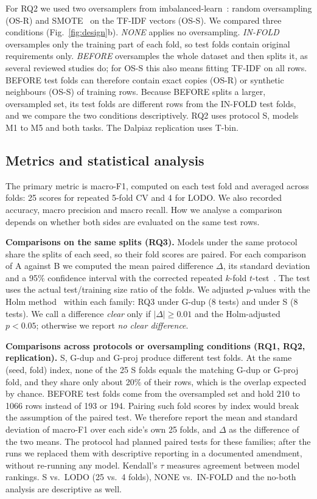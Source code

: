For RQ2 we used two oversamplers from imbalanced-learn~\cite{lemaitre2017}: random oversampling (OS-R) and SMOTE~\cite{chawla2002} on the TF-IDF vectors (OS-S). We compared three conditions (Fig.~\ref{fig:design}b). \emph{NONE} applies no oversampling. \emph{IN-FOLD} oversamples only the training part of each fold, so test folds contain original requirements only. \emph{BEFORE} oversamples the whole dataset and then splits it, as several reviewed studies do; for OS-S this also means fitting TF-IDF on all rows. BEFORE test folds can therefore contain exact copies (OS-R) or synthetic neighbours (OS-S) of training rows. Because BEFORE splits a larger, oversampled set, its test folds are different rows from the IN-FOLD test folds, and we compare the two conditions descriptively. RQ2 uses protocol S, models M1 to M5 and both tasks. The Dalpiaz replication uses T-bin.

\subsection{Metrics and statistical analysis}

The primary metric is macro-F1, computed on each test fold and averaged across folds: 25 scores for repeated 5-fold CV and 4 for LODO. We also recorded accuracy, macro precision and macro recall. How we analyse a comparison depends on whether both sides are evaluated on the same test rows.

\textbf{Comparisons on the same splits (RQ3).} Models under the same protocol share the splits of each seed, so their fold scores are paired. For each comparison of A against B we computed the mean paired difference $\Delta$, its standard deviation and a 95\% confidence interval with the corrected repeated $k$-fold $t$-test~\cite{nadeau2003,bouckaert2004}. The test uses the actual test/training size ratio of the folds. We adjusted $p$-values with the Holm method~\cite{holm1979} within each family: RQ3 under G-dup (8 tests) and under S (8 tests). We call a difference \emph{clear} only if $|\Delta| \geq 0.01$ and the Holm-adjusted $p < 0.05$; otherwise we report \emph{no clear difference}.

\textbf{Comparisons across protocols or oversampling conditions (RQ1, RQ2, replication).} S, G-dup and G-proj produce different test folds. At the same (seed, fold) index, none of the 25 S folds equals the matching G-dup or G-proj fold, and they share only about 20\% of their rows, which is the overlap expected by chance. BEFORE test folds come from the oversampled set and hold 210 to 1066 rows instead of 193 or 194. Pairing such fold scores by index would break the assumption of the paired test. We therefore report the mean and standard deviation of macro-F1 over each side's own 25 folds, and $\Delta$ as the difference of the two means. The protocol had planned paired tests for these families; after the runs we replaced them with descriptive reporting in a documented amendment, without re-running any model. Kendall's $\tau$ measures agreement between model rankings. S vs.\ LODO (25 vs.\ 4 folds), NONE vs.\ IN-FOLD and the no-both analysis are descriptive as well.


